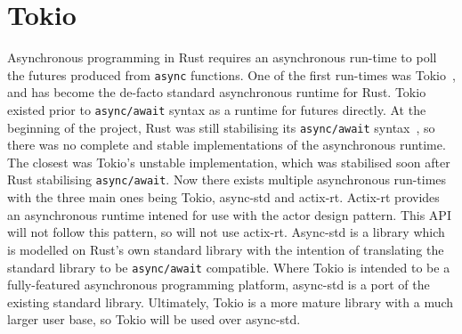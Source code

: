\newcommand{\asyncawait}{\texttt{async/await}}

\section{Tokio}\label{sec:tokio}
Asynchronous programming in Rust requires an asynchronous run-time to poll the futures produced from \texttt{async}
functions.
One of the first run-times was Tokio~\citep{tokiocommunity_tokioasynchronousruntime_}, and has become the de-facto standard
asynchronous runtime for Rust.
Tokio existed prior to \asyncawait{} syntax as a runtime for futures directly.
At the beginning of the project, Rust was still stabilising its \asyncawait{} syntax~\citep{withoutboats_asyncawaitnotation_},
so there was no
complete and stable implementations of the asynchronous runtime.
The closest was Tokio's unstable implementation, which was stabilised soon after Rust stabilising
\asyncawait{}.
Now there exists multiple asynchronous run-times with the three main ones being Tokio, async-std and actix-rt.
Actix-rt provides an asynchronous runtime intened for use with the actor design pattern.
This API will not follow this pattern, so will not use actix-rt.
Async-std is a library which is modelled on Rust's own standard library with the intention of translating the standard
library to be \asyncawait{} compatible.
Where Tokio is intended to be a fully-featured asynchronous programming platform, async-std is a port of the existing
standard library.
Ultimately, Tokio is a more mature library with a much larger user base, so Tokio will be used over async-std.


